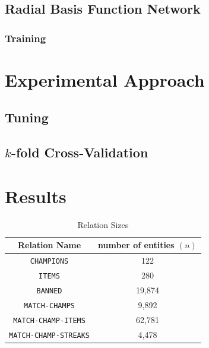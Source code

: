 \documentclass[conference]{IEEEtran}
\begin{document}
  \subsection{Radial Basis Function Network}

    \subsubsection{Training}
  
\section{Experimental Approach}
  \subsection{Tuning}

  \subsection{$k$-fold Cross-Validation}

\section{Results}
  
\begin{table}[H]
  \caption{Relation Sizes}
  \resizebox{1.3\textwidth}{!} {\begin{minipage}{\textwidth}

      \begin{tabular}{ | c | c |}
        \hline
        Relation Name & number of entities $(n)$ \\ \hline
        \texttt{CHAMPIONS} & 122 \\
        \texttt{ITEMS} & 280 \\
        \texttt{BANNED} & 19,874 \\
        \texttt{MATCH-CHAMPS} & 9,892 \\
        \texttt{MATCH-CHAMP-ITEMS} & 62,781 \\
        \texttt{MATCH-CHAMP-STREAKS} & 4,478 \\ \hline
      \end{tabular}

      \label{table:sizeTable}
  \end{minipage} }
\end{table}
\end{document}
